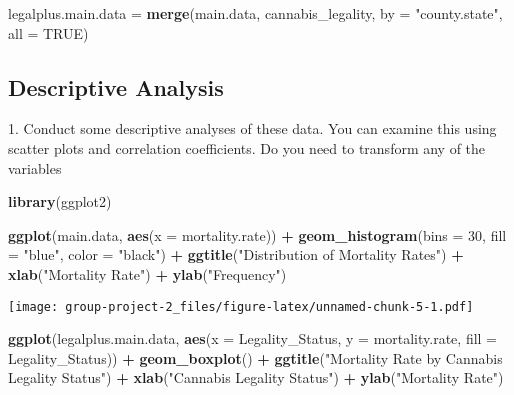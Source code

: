 \documentclass[
]{article}
\newenvironment{Shaded}{\begin{snugshade}}{\end{snugshade}}
\newcommand{\AttributeTok}[1]{\textcolor[rgb]{0.13,0.29,0.53}{#1}}
\newcommand{\ConstantTok}[1]{\textcolor[rgb]{0.56,0.35,0.01}{#1}}
\newcommand{\DecValTok}[1]{\textcolor[rgb]{0.00,0.00,0.81}{#1}}
\newcommand{\FunctionTok}[1]{\textcolor[rgb]{0.13,0.29,0.53}{\textbf{#1}}}
\newcommand{\NormalTok}[1]{#1}
\newcommand{\OtherTok}[1]{\textcolor[rgb]{0.56,0.35,0.01}{#1}}
\newcommand{\SpecialCharTok}[1]{\textcolor[rgb]{0.81,0.36,0.00}{\textbf{#1}}}
\newcommand{\StringTok}[1]{\textcolor[rgb]{0.31,0.60,0.02}{#1}}
\begin{document}
\begin{Shaded}
\begin{Highlighting}[]
\NormalTok{legalplus.main.data }\OtherTok{=} \FunctionTok{merge}\NormalTok{(main.data, cannabis\_legality, }\AttributeTok{by =} \StringTok{"county.state"}\NormalTok{, }\AttributeTok{all =} \ConstantTok{TRUE}\NormalTok{)}
\end{Highlighting}
\end{Shaded}

\hypertarget{descriptive-analysis}{%
\subsection{Descriptive Analysis}\label{descriptive-analysis}}

1. Conduct some descriptive analyses of these data. You can examine this
using scatter plots and correlation coefficients. Do you need to
transform any of the variables

\begin{Shaded}
\begin{Highlighting}[]
\FunctionTok{library}\NormalTok{(ggplot2)}


\FunctionTok{ggplot}\NormalTok{(main.data, }\FunctionTok{aes}\NormalTok{(}\AttributeTok{x =}\NormalTok{ mortality.rate)) }\SpecialCharTok{+}
  \FunctionTok{geom\_histogram}\NormalTok{(}\AttributeTok{bins =} \DecValTok{30}\NormalTok{, }\AttributeTok{fill =} \StringTok{"blue"}\NormalTok{, }\AttributeTok{color =} \StringTok{"black"}\NormalTok{) }\SpecialCharTok{+}
  \FunctionTok{ggtitle}\NormalTok{(}\StringTok{"Distribution of Mortality Rates"}\NormalTok{) }\SpecialCharTok{+}
  \FunctionTok{xlab}\NormalTok{(}\StringTok{"Mortality Rate"}\NormalTok{) }\SpecialCharTok{+}
  \FunctionTok{ylab}\NormalTok{(}\StringTok{"Frequency"}\NormalTok{)}
\end{Highlighting}
\end{Shaded}

\texttt{[image: group-project-2\_files/figure-latex/unnamed-chunk-5-1.pdf]}

\begin{Shaded}
\begin{Highlighting}[]
\FunctionTok{ggplot}\NormalTok{(legalplus.main.data, }\FunctionTok{aes}\NormalTok{(}\AttributeTok{x =}\NormalTok{ Legality\_Status, }\AttributeTok{y =}\NormalTok{ mortality.rate, }\AttributeTok{fill =}\NormalTok{ Legality\_Status)) }\SpecialCharTok{+}
  \FunctionTok{geom\_boxplot}\NormalTok{() }\SpecialCharTok{+}
  \FunctionTok{ggtitle}\NormalTok{(}\StringTok{"Mortality Rate by Cannabis Legality Status"}\NormalTok{) }\SpecialCharTok{+}
  \FunctionTok{xlab}\NormalTok{(}\StringTok{"Cannabis Legality Status"}\NormalTok{) }\SpecialCharTok{+}
  \FunctionTok{ylab}\NormalTok{(}\StringTok{"Mortality Rate"}\NormalTok{)}
\end{Highlighting}
\end{Shaded}
\end{document}
